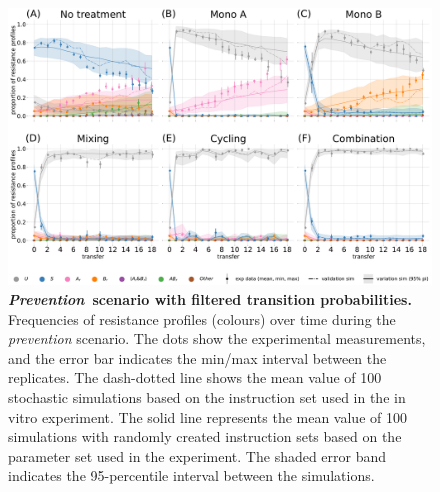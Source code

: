 \clearpage
\begin{figure}[p]
     \centering
     \includegraphics[width=\linewidth]{supplementary_1/figures/20210417_timeplot_clean.pdf}
     \caption{\textbf{\textit{Prevention}~scenario with filtered transition probabilities.}
     Frequencies of resistance profiles (colours) over time during the \textit{prevention} scenario.
     The dots show the experimental measurements, and the error bar indicates the min/max interval between the replicates. 
     The dash-dotted line shows the mean value of 100 stochastic simulations based on the instruction set used in the in vitro experiment. 
     The solid line represents the mean value of 100 simulations with randomly created instruction sets based on the parameter set used in the experiment. 
     The shaded error band indicates the 95-percentile interval between the simulations.}
     \label{fig:exp1_filtered}
\end{figure}


